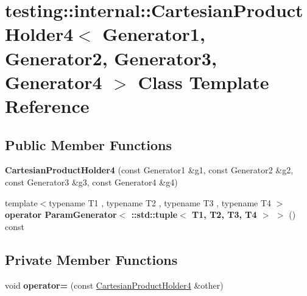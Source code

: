 \hypertarget{classtesting_1_1internal_1_1_cartesian_product_holder4}{}\section{testing\+:\+:internal\+:\+:Cartesian\+Product\+Holder4$<$ Generator1, Generator2, Generator3, Generator4 $>$ Class Template Reference}
\label{classtesting_1_1internal_1_1_cartesian_product_holder4}
\subsection*{Public Member Functions}
\begin{DoxyCompactItemize}
\item 
\mbox{\label{classtesting_1_1internal_1_1_cartesian_product_holder4_a07fe92a091d7717a159d7ba5f2fe3c75}} 
{\bfseries Cartesian\+Product\+Holder4} (const Generator1 \&g1, const Generator2 \&g2, const Generator3 \&g3, const Generator4 \&g4)
\item 
\mbox{\label{classtesting_1_1internal_1_1_cartesian_product_holder4_a6138a6d2767e2381266fe8676adbdd0b}} 
{\footnotesize template$<$typename T1 , typename T2 , typename T3 , typename T4 $>$ }\\{\bfseries operator Param\+Generator$<$ \+::std\+::tuple$<$ T1, T2, T3, T4 $>$ $>$} () const
\end{DoxyCompactItemize}
\subsection*{Private Member Functions}
\begin{DoxyCompactItemize}
\item 
\mbox{\label{classtesting_1_1internal_1_1_cartesian_product_holder4_a71bd487abedd285ff0f33d789cb83e8b}} 
void {\bfseries operator=} (const \mbox{\hyperlink{classtesting_1_1internal_1_1_cartesian_product_holder4}{Cartesian\+Product\+Holder4}} \&other)
\end{DoxyCompactItemize}

